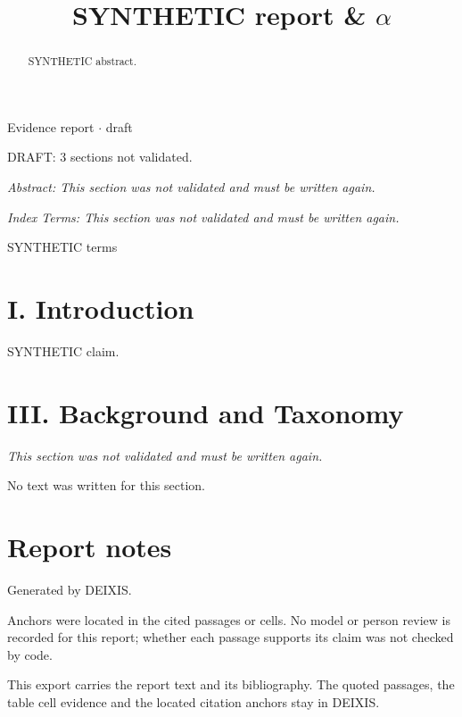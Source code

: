 \documentclass[journal]{IEEEtran}
\begin{document}
\title{SYNTHETIC report \& \ensuremath{\alpha}}

\maketitle

\noindent Evidence report \ensuremath{\cdot} draft

\noindent DRAFT: 3 sections not validated.

\noindent\textit{Abstract: This section was not validated and must be written again.}

\begin{abstract}

SYNTHETIC abstract.

\end{abstract}

\noindent\textit{Index Terms: This section was not validated and must be written again.}

\begin{IEEEkeywords}

SYNTHETIC terms

\end{IEEEkeywords}

\section*{I. Introduction}

SYNTHETIC claim. \cite{Synth26}

\section*{III. Background and Taxonomy}

\noindent\textit{This section was not validated and must be written again.}

No text was written for this section.

\section*{Report notes}

Generated by DEIXIS.

Anchors were located in the cited passages or cells. No model or person review is recorded for this report; whether each passage supports its claim was not checked by code.

This export carries the report text and its bibliography. The quoted passages, the table cell evidence and the located citation anchors stay in DEIXIS.




\end{document}
